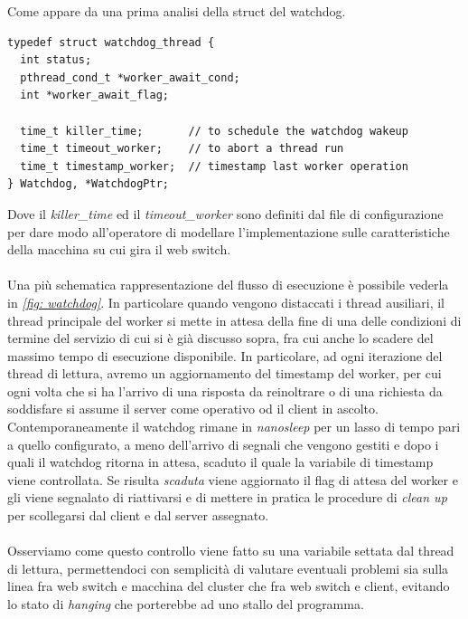 \documentclass[italian]{tktltiki2}
\begin{document}
Come appare da una prima analisi della struct del watchdog.
\begin{lstlisting}
typedef struct watchdog_thread {
  int status;                                     
  pthread_cond_t *worker_await_cond;             
  int *worker_await_flag;

  time_t killer_time;       // to schedule the watchdog wakeup
  time_t timeout_worker;    // to abort a thread run
  time_t timestamp_worker;  // timestamp last worker operation
} Watchdog, *WatchdogPtr;
\end{lstlisting}
Dove il \emph{killer\_time} ed il \emph{timeout\_worker} sono definiti dal file di configurazione per dare modo all'operatore di modellare l'implementazione sulle caratteristiche della macchina su cui gira il web switch. 
\\
\\
Una più schematica rappresentazione del flusso di esecuzione è possibile vederla in \emph{\ref{fig: watchdog}}.
In particolare quando vengono distaccati i thread ausiliari, il thread principale del worker si mette in attesa della fine di una delle condizioni di termine del servizio di cui si è già discusso sopra, fra cui anche lo scadere del massimo tempo di esecuzione disponibile. In particolare, ad ogni iterazione del thread di lettura, avremo un aggiornamento del timestamp del worker, per cui ogni volta che si ha l'arrivo di una risposta da reinoltrare o di una richiesta da soddisfare si assume il server come operativo od il client in ascolto. 
\\ 
Contemporaneamente il watchdog rimane in \emph{nanosleep} per un lasso di tempo pari a quello configurato, a meno dell'arrivo di segnali che vengono gestiti e dopo i quali il watchdog ritorna in attesa, scaduto il quale la variabile di timestamp viene controllata. Se risulta \emph{scaduta} viene aggiornato il flag di attesa del worker e gli viene segnalato di riattivarsi e di mettere in pratica le procedure di \emph{clean up} per scollegarsi dal client e dal server assegnato. 
\\
\\
Osserviamo come questo controllo viene fatto su una variabile settata dal thread di lettura, permettendoci con semplicità di valutare eventuali problemi sia sulla linea fra web switch e macchina del cluster che fra web switch e client, evitando lo stato di \emph{hanging} che porterebbe ad uno stallo del programma.
\newpage
\end{document}
